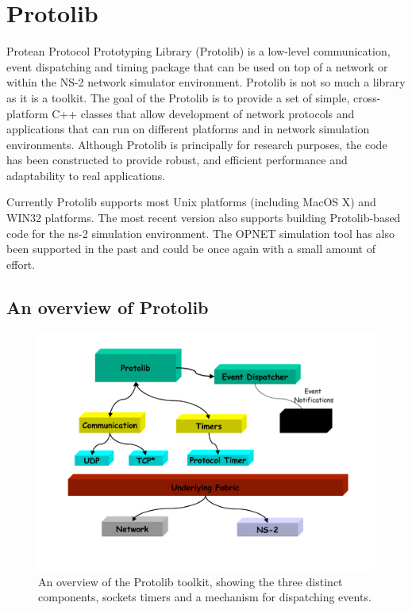 \chapter{Protolib}
\label{protolib}


Protean Protocol Prototyping Library (Protolib) is a low-level 
communication, event dispatching and timing package that 
can be used on top of a network or within the NS-2 network 
simulator environment.  Protolib is not so much a library as it 
is a toolkit.  The goal of the Protolib is to provide a set of simple, 
cross-platform C++ classes that allow development of network 
protocols and applications that can run on different platforms and in 
network simulation environments.  Although Protolib is principally for
research purposes, the code has been constructed to provide
robust, and efficient performance and adaptability to real
applications.

Currently Protolib supports most Unix platforms (including
MacOS X) and WIN32 platforms.  The most recent version also
supports building Protolib-based code for the ns-2 simulation
environment.  The OPNET simulation tool has also been supported
in the past and could be once again with a small amount of
effort.



\section{An overview of Protolib}

\begin{figure}
\centering
\includegraphics[scale=0.4]{images/protolibOverview}
\caption{An overview of the Protolib toolkit, showing the three distinct 
components, sockets timers and a mechanism for dispatching events.} 
\label{pai:fig:overview}
\end{figure}


